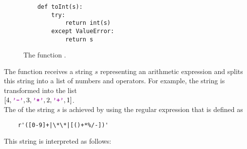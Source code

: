 \begin{figure}[!ht]
\centering
\begin{verbatim}
    def toInt(s):
        try:
            return int(s)   
        except ValueError:
            return s                
\end{verbatim}
\vspace*{-0.3cm}
\caption{The function .}
\label{fig:toInt.py}
\end{figure}

The function  receives a string $s$ representing an arithmetic expression and splits this
string into a list of numbers and operators. For example, the string  is transformed into the list
\\[0.2cm]
\hspace*{1.3cm}
$[4, \mytt{'-'}, 3, \mytt{'*'}, 2, \mytt{'+'}, 1]$.
\\[0.2cm]
The  of the string $s$ is achieved by using the regular expression that is defined as
\begin{verbatim}
    r'([0-9]+|\*\*|[()+*%/-])'
\end{verbatim}
This string is interpreted as follows:
